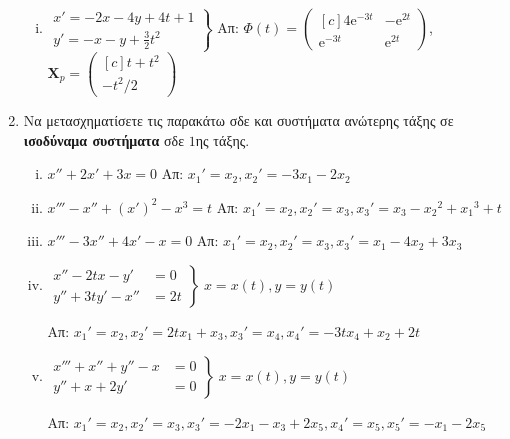 \begin{enumerate}
\begin{enumerate}[i)]
      \item $ 
        \left.
          \begin{matrix}
            x'=-2x-4y+4t+1 \\
            y'=-x-y+ \frac{3}{2} t^{2}
          \end{matrix} 
        \right\} $
        \hfill Απ: $ \Phi(t) = 
        \begin{pmatrix*}[c]
          4 \mathrm{e}^{-3t} & - \mathrm{e}^{2t} \\
          \mathrm{e}^{-3t} & \mathrm{e}^{2t}
        \end{pmatrix*} $, \; $ \mathbf{X}_{p} = 
        \begin{pmatrix*}[c] 
          t+t^{2} \\ - t^{2}/2
        \end{pmatrix*} $   
    \end{enumerate}

  \item Να μετασχηματίσετε τις παρακάτω σδε και συστήματα ανώτερης τάξης σε 
    \textbf{ισοδύναμα συστήματα} σδε $1$ης τάξης.

    \begin{enumerate}[i),itemsep=10pt]
      \item $x''+2x'+3x=0$ \hfill Απ: ${x_{1}}'= x_{2}, {x_{2}}'=-3x_{1}-2x_{2}$
      \item $x'''-x''+(x')^{2}-x^{3}=t$ 
        \hfill Απ: ${x_{1}}'= x_{2}, {x_{2}}'=x_{3},{x_{3}}'=x_{3}-{x_{2}}^{2}+
        {x_{1}}^{3}+t$
      \item $x'''-3x''+4x'-x=0$ 
        \hfill Απ: ${x_{1}}'= x_{2}, {x_{2}}'=x_{3}, {x_{3}}'=x_{1}-4x_{2}+3x_{3}$
      \item
        \(
        \left.
          \begin{aligned}
            x''- 2tx - y'  &=0 \\
            y''+3ty' -x'' &=2t
          \end{aligned}
        \right\}\; x=x(t), y=y(t)
        \)

        \hfill Απ: ${x_{1}}'= x_{2}, {x_{2}}'=2tx_{1}+x_{3}, {x_{3}}'=x_{4}, {x_{4}}'
        =-3tx_{4}+x_{2}+2t$
      \item
        \(
        \left.
          \begin{aligned}
            x'''+ x'' + y'' - x &=0 \\
            y''+x +2y' &=0
          \end{aligned}
        \right\}\; x=x(t), y=y(t)
        \)

        \hfill Απ: ${x_{1}}'= x_{2}, {x_{2}}'=x_{3}, {x_{3}}'
        =-2x_{1}-x_{3}+2x_{5}, {x_{4}}'=x_{5}, {x_{5}}'=-x_{1}-2x_{5}$
    \end{enumerate}
\end{enumerate}

